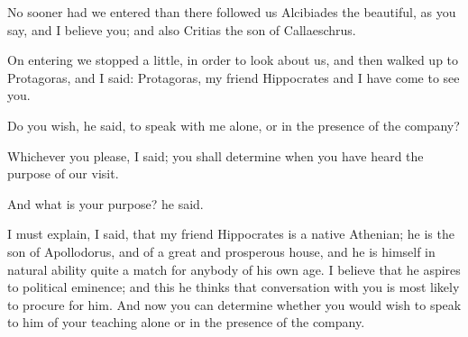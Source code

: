 \documentclass[11pt,letter]{article}
\begin{document}
\par  No sooner had we entered than there followed us Alcibiades the beautiful, as you say, and I believe you; and also Critias the son of Callaeschrus.

\par  On entering we stopped a little, in order to look about us, and then walked up to Protagoras, and I said: Protagoras, my friend Hippocrates and I have come to see you.

\par  Do you wish, he said, to speak with me alone, or in the presence of the company?

\par  Whichever you please, I said; you shall determine when you have heard the purpose of our visit.

\par  And what is your purpose? he said.

\par  I must explain, I said, that my friend Hippocrates is a native Athenian; he is the son of Apollodorus, and of a great and prosperous house, and he is himself in natural ability quite a match for anybody of his own age. I believe that he aspires to political eminence; and this he thinks that conversation with you is most likely to procure for him. And now you can determine whether you would wish to speak to him of your teaching alone or in the presence of the company.
\end{document}
